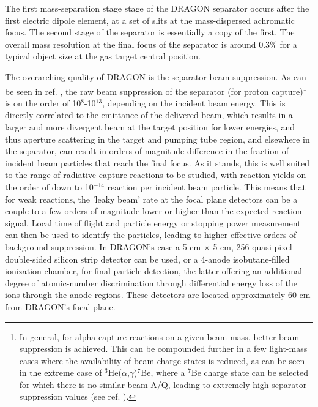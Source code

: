 The first mass-separation stage stage of the DRAGON separator occurs after the first electric dipole element, at a set of slits at the mass-dispersed achromatic focus. The second stage of the separator is essentially a copy of the first. The overall mass resolution at the final focus of the separator is around 0.3\% for a typical object size at the gas target central position.  

The overarching quality of DRAGON is the separator beam suppression. As can be seen in ref. \cite{hutc08}, the raw beam suppression of the separator (for proton capture)\footnote{In general, for alpha-capture reactions on a given beam mass, better beam suppression is achieved. This can be compounded further in a few light-mass cases where the availability of beam charge-states is reduced, as can be seen in the extreme case of $^{3}$He($\alpha$,$\gamma$)$^{7}$Be, where a $^{7}$Be charge state can be selected for which there is no similar beam A/Q, leading to extremely high separator suppression values (see ref. \cite{sju12}).} is on the order of 10$^{8}$-10$^{13}$, depending on the incident beam energy. This is directly correlated to the emittance of the delivered beam, which results in a larger and more divergent beam at the target position for lower energies, and thus aperture scattering in the target and pumping tube region, and elsewhere in the separator, can result in orders of magnitude difference in the fraction of incident beam particles that reach the final focus. As it stands, this is well suited to the range of radiative capture reactions to be studied, with reaction yields on the order of down to 10$^{-14}$ reaction per incident beam particle. This means that for weak reactions, the 'leaky beam' rate at the focal plane detectors can be a couple to a few orders of magnitude lower or higher than the expected reaction signal. Local time of flight and particle energy or stopping power measurement can then be used to identify the particles, leading to higher effective orders of background suppression. In DRAGON's case a 5 cm $\times$ 5 cm, 256-quasi-pixel double-sided silicon strip detector can be used, or a 4-anode isobutane-filled ionization chamber, for final particle detection, the latter offering an additional degree of atomic-number discrimination through differential energy loss of the ions through the anode regions. These detectors are located approximately 60 cm from DRAGON's focal plane.


